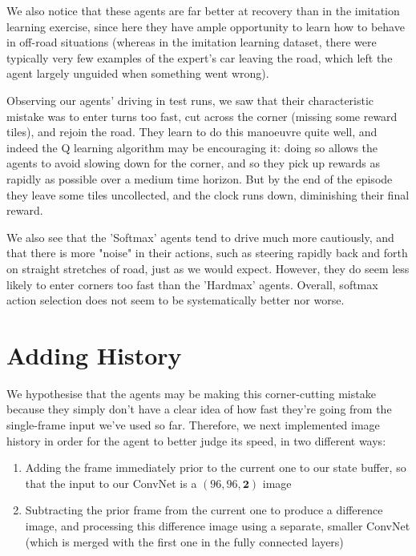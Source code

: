 \documentclass[a4paper, 11pt, conference]{ieeeconf}      %
\begin{document}
We also notice that these agents are far better at recovery than in the imitation learning exercise, since here they have ample opportunity to learn how to behave in off-road situations (whereas in the imitation learning dataset, there were typically very few examples of the expert's car leaving the road, which left the agent largely unguided when something went wrong).

Observing our agents' driving in test runs, we saw that their characteristic mistake was to enter turns too fast, cut across the corner (missing some reward tiles), and rejoin the road. They learn to do this manoeuvre quite well, and indeed the Q learning algorithm may be encouraging it: doing so allows the agents to avoid slowing down for the corner, and so they pick up rewards as rapidly as possible over a medium time horizon. But by the end of the episode they leave some tiles uncollected, and the clock runs down, diminishing their final reward.

We also see that the 'Softmax' agents tend to drive much more cautiously, and that there is more "noise" in their actions, such as steering rapidly back and forth on straight stretches of road, just as we would expect. However, they do seem less likely to enter corners too fast than the 'Hardmax' agents. Overall, softmax action selection does not seem to be systematically better nor worse.

\section{Adding History}

We hypothesise that the agents may be making this corner-cutting mistake because they simply don't have a clear idea of how fast they're going from the single-frame input we've used so far. Therefore, we next implemented image history in order for the agent to better judge its speed, in two different ways:

\begin{enumerate}
	\item Adding the frame immediately prior to the current one to our state buffer, so that the input to our ConvNet is a $(96, 96, \textbf{2})$ image

	\item Subtracting the prior frame from the current one to produce a difference image, and processing this difference image using a separate, smaller ConvNet (which is merged with the first one in the fully connected layers)
\end{enumerate}
\end{document}
